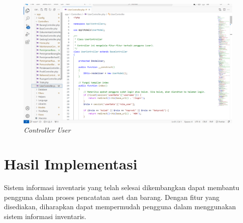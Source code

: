 \begin{enumerate}
        \begin{figure}
          \centering
          \includegraphics[width=0.82\linewidth]{konten//gambar/user controller.png}
          \caption{\textit{Controller User}}
          \label{fig:enter-label}
        \end{figure}

\end{enumerate}

\section{Hasil Implementasi}

Sistem informasi inventaris yang telah selesai dikembangkan dapat membantu pengguna dalam proses pencatatan aset dan barang. Dengan fitur yang disediakan, diharapkan dapat mempermudah pengguna dalam menggunakan sistem informasi inventaris.

